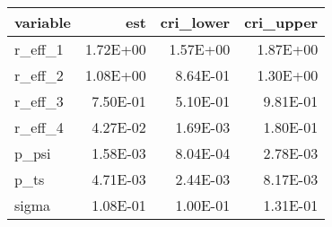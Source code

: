 \begin{table}[ht]
\centering
\begin{tabular}{lrrr}
  \hline
variable & est & cri\_lower & cri\_upper \\ 
  \hline
r\_eff\_1 & 1.72E+00 & 1.57E+00 & 1.87E+00 \\ 
  r\_eff\_2 & 1.08E+00 & 8.64E-01 & 1.30E+00 \\ 
  r\_eff\_3 & 7.50E-01 & 5.10E-01 & 9.81E-01 \\ 
  r\_eff\_4 & 4.27E-02 & 1.69E-03 & 1.80E-01 \\ 
  p\_psi & 1.58E-03 & 8.04E-04 & 2.78E-03 \\ 
  p\_ts & 4.71E-03 & 2.44E-03 & 8.17E-03 \\ 
  sigma & 1.08E-01 & 1.00E-01 & 1.31E-01 \\ 
   \hline
\end{tabular}
\end{table}
